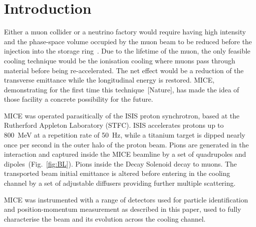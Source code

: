 \section{Introduction}
\label{Sect:Intro}

Either a muon collider or a neutrino factory would require having high intensity and the phase-space volume occupied by the muon beam to be reduced before the injection into the storage ring~\cite{Geer:1998PhRvD..57.6989G}.
Due to the lifetime of the muon, the only feasible cooling technique would be the ionisation cooling \cite{Neuffer:1983jr} where muons pass through material before being re-accelerated. The net effect would be a reduction of the transverse emittance while the longitudinal energy is restored.
MICE, demonstrating for the first time this technique~[Nature], has made the idea of those facility a concrete possibility for the future.
  
  
  
MICE was operated parasitically of the ISIS proton synchrotron, based at the Rutherford Appleton Laboratory (STFC).
ISIS accelerates protons up to 800~MeV at a repetition rate of 50~Hz, while a titanium target is dipped nearly once per second in the outer halo of the proton beam.
Pions are generated in the interaction and captured inside the MICE beamline by a set of quadrupoles and dipoles~(Fig.~\ref{fig:BL}). Pions inside the Decay Solenoid decay to muons.
The transported beam initial emittance is altered before entering in the cooling channel by a set of adjustable diffusers providing further multiple scattering.

MICE was instrumented with a range of detectors used for particle identification and position-momentum measurement as described in this paper, used to fully characterise the beam and its evolution across the cooling channel.
